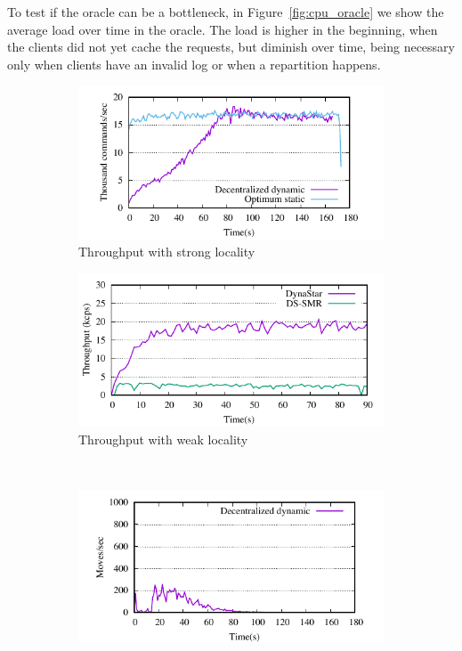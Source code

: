 To test if the oracle can be a bottleneck, in Figure~\ref{fig:cpu_oracle} we show the average load over time in the oracle.
The load is higher in the beginning, when the clients did not yet cache the requests, but diminish over time, being
necessary only when clients have an invalid log or when a repartition happens.



\begin{figure}[ht!]
  \centering
  \begin{subfigure}[b]{0.45\textwidth}
    \centering
    \includegraphics[width=0.95\columnwidth]{figures/motivation-tp-strong-locality}    
    \caption{Throughput with strong locality }
  \end{subfigure}
  \begin{subfigure}[b]{0.45\textwidth}
    \centering
    \includegraphics[width=0.95\columnwidth]{figures/experiments/tp-dynastar-vs-dssmr-4p}
    \caption{Throughput with weak locality}
  \end{subfigure} \\
  \begin{subfigure}[b]{0.45\textwidth}
    \centering
    \includegraphics[width=0.95\columnwidth]{figures/motivation-moves-strong-locality}

\end{subfigure}
\end{figure}
